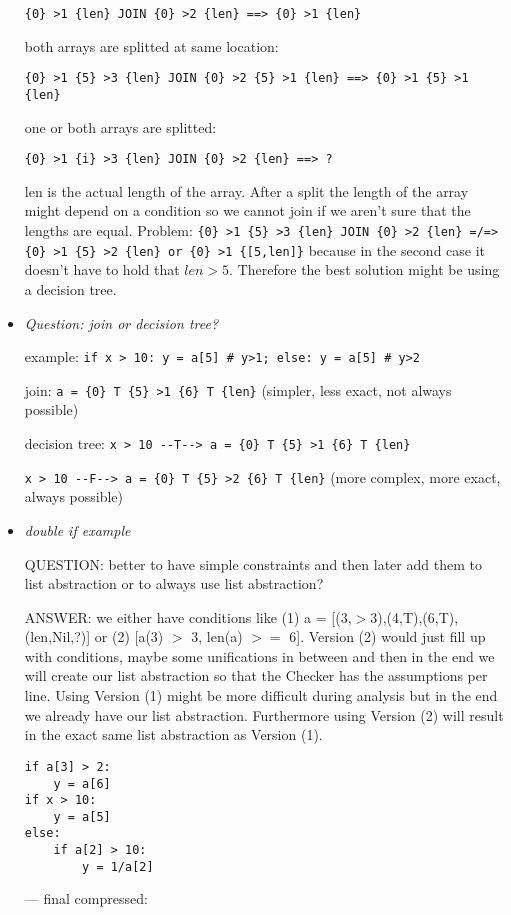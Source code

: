 \documentclass[11pt]{article}
\begin{document}
\begin{itemize}
\verb|{0} >1 {len} JOIN {0} >2 {len} ==> {0} >1 {len}|

both arrays are splitted at same location:

\verb|{0} >1 {5} >3 {len} JOIN {0} >2 {5} >1 {len} ==> {0} >1 {5} >1 {len}|

one or both arrays are splitted:

\verb|{0} >1 {i} >3 {len} JOIN {0} >2 {len} ==> ?|

len is the actual length of the array. After a split the length of the array might depend on a condition so we cannot join if we aren't sure that the lengths are equal. Problem: \verb|{0} >1 {5} >3 {len} JOIN {0} >2 {len} =/=> {0} >1 {5} >2 {len} or {0} >1 {[5,len]}| because in the second case it doesn't have to hold that $len > 5$. Therefore the best solution might be using a decision tree.


\item \textit{Question: join or decision tree?}

example: \verb|if x > 10: y = a[5] # y>1; else: y = a[5] # y>2|

join: \verb|a = {0} T {5} >1 {6} T {len}| (simpler, less exact, not always possible)

decision tree: \verb|x > 10 --T--> a = {0} T {5} >1 {6} T {len}|

\verb|x > 10 --F--> a = {0} T {5} >2 {6} T {len}| (more complex, more exact, always possible)


\item \textit {double if example}

QUESTION: better to have simple constraints and then later add them to list abstraction or to always use list abstraction?

ANSWER: we either have conditions like (1) a = [(3,$>$3),(4,T),(6,T),(len,Nil,?)] or (2) [a(3) $>$ 3, len(a) $>=$ 6]. Version (2) would just fill up with conditions, maybe some unifications in between and then in the end we will create our list abstraction so that the Checker has the assumptions per line. Using Version (1) might be more difficult during analysis but in the end we already have our list abstraction. Furthermore using Version (2) will result in the exact same list abstraction as Version (1).

\begin{lstlisting}[numbers=none]
if a[3] > 2:
    y = a[6]
if x > 10:
    y = a[5]
else:
    if a[2] > 10:
        y = 1/a[2]
\end{lstlisting}

--- final compressed:


\end{itemize}
\end{document}
